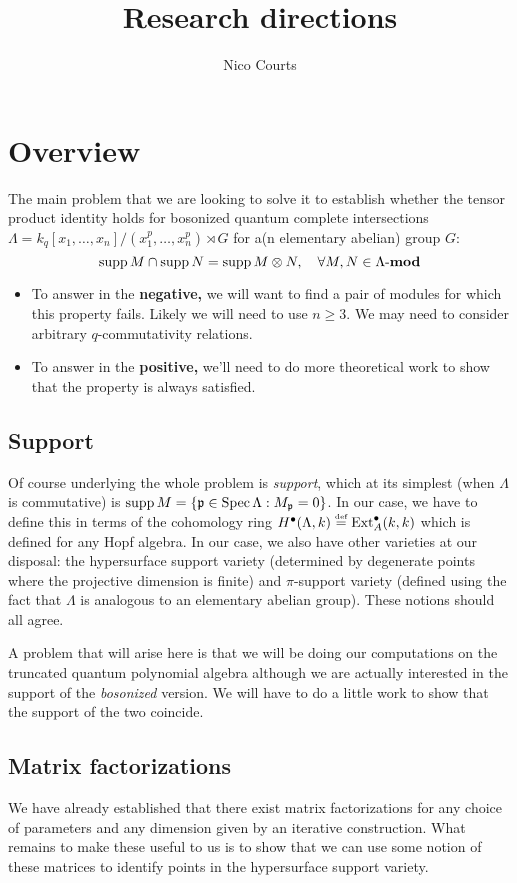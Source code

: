 \documentclass[12pt]{article}
\begin{document}
\title{Research directions}
\author{Nico Courts}
\date{}
\maketitle

\section{Overview}
The main problem that we are looking to solve it to establish whether the tensor product identity holds for bosonized quantum complete intersections $\Lambda=k_q[x_1,\dots,x_n]/(x_1^p,\dots, x_n^p)\rtimes G$ for a(n elementary abelian) group $G$: 
\[\operatorname{supp} M\cap \operatorname{supp} N = \operatorname{supp} M\otimes N,\quad\forall M,N\in \Lambda\text{-}\mathbf{mod}\]

\begin{itemize}
    \item To answer in the \textbf{negative,} we will want to find a pair of modules for which this property fails. Likely we will need to use $n\ge 3$. We may need to consider arbitrary $q$-commutativity relations.
    \item To answer in the \textbf{positive,} we'll need to do more theoretical work to show that the property is always satisfied.
\end{itemize}

\subsection{Support}
Of course underlying the whole problem is \textit{support}, which at its simplest (when $\Lambda$ is commutative) is $\operatorname{supp} M=\{\mathfrak{p}\in\operatorname{Spec}\Lambda:M_{\mathfrak{p}} =0\}$. In our case, we have to define this in terms of the cohomology ring $H^\bullet(\Lambda, k)\stackrel{\text{\tiny def}}{=}\operatorname{Ext}^\bullet_A(k,k)$ which is defined for any Hopf algebra. In our case, we also have other varieties at our disposal: the hypersurface support variety (determined by degenerate points where the projective dimension is finite) and $\pi$-support variety (defined using the fact that $\Lambda$ is analogous to an elementary abelian group). These notions should all agree.

A problem that will arise here is that we will be doing our computations on the truncated quantum polynomial algebra although we are actually interested in the support of the \textit{bosonized} version. We will have to do a little work to show that the support of the two coincide.

\subsection{Matrix factorizations}
We have already established that there exist matrix factorizations for any choice of parameters and any dimension given by an iterative construction. What remains to make these useful to us is to show that we can use some notion of these matrices to identify points in the hypersurface support variety. 
\end{document}
